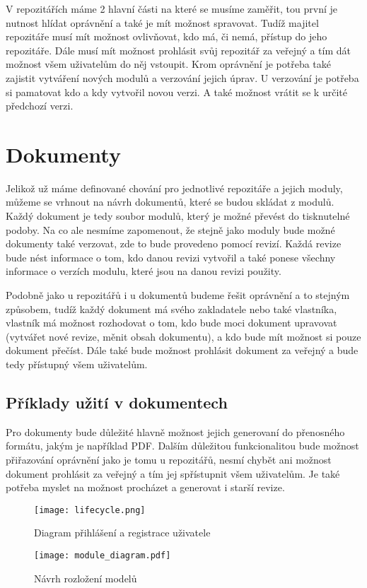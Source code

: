 V repozitářích máme 2 hlavní části na které se musíme zaměřit, tou první je nutnost hlídat oprávnění a také je mít možnost spravovat. Tudíž majitel
repozitáře musí mít možnost ovlivňovat, kdo má, či nemá, přístup do jeho repozitáře. Dále musí mít možnost prohlásit svůj repozitář za veřejný a tím
dát možnost všem uživatelům do něj vstoupit. Krom oprávnění je potřeba také zajistit vytváření nových modulů a verzování jejich úprav. U verzování je
potřeba si pamatovat kdo a kdy vytvořil novou verzi. A také možnost vrátit se k určité předchozí verzi.

\section{Dokumenty}

Jelikož už máme definované chování pro jednotlivé repozitáře a jejich moduly, můžeme se vrhnout na návrh dokumentů, které se budou skládat z modulů. Každý
dokument je tedy soubor modulů, který je možné převést do tisknutelné podoby. Na co ale nesmíme zapomenout, že stejně jako moduly bude možné dokumenty také
verzovat, zde to bude provedeno pomocí revizí. Každá revize bude nést informace o tom, kdo danou revizi vytvořil a také ponese všechny informace o verzích
modulu, které jsou na danou revizi použity.

Podobně jako u repozitářů i u dokumentů budeme řešit oprávnění a to stejným způsobem, tudíž každý dokument má svého zakladatele nebo také vlastníka,
vlastník má možnost rozhodovat o tom, kdo bude moci dokument upravovat (vytvářet nové revize, měnit obsah dokumentu), a kdo bude mít možnost si pouze dokument
přečíst. Dále také bude možnost prohlásit dokument za veřejný a bude tedy přístupný všem uživatelům.

\subsection{Příklady užití v dokumentech}

Pro dokumenty bude důležité hlavně možnost jejich generovaní do přenosného formátu, jakým je například PDF. Dalším důležitou funkcionalitou bude možnost přiřazování
oprávnění jako je tomu u repozitářů, nesmí chybět ani možnost dokument prohlásit za veřejný a tím jej spřístupnit všem uživatelům. Je také potřeba myslet na možnost
procházet a generovat i starší revize.

\begin{figure}[h]
    \centering
    \texttt{[image: lifecycle.png]}
    \caption{Diagram přihlášení a registrace uživatele}
    \label{fig:userFlow}
\end{figure}

\begin{figure}[h]
    \centering
    \texttt{[image: module\_diagram.pdf]}
    \caption{Návrh rozložení modelů}
    \label{fig:moduleDia}
\end{figure}